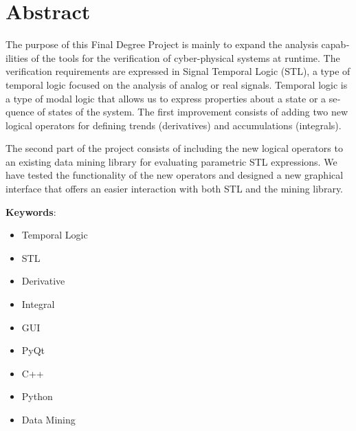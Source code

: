 \section*{Abstract}
\begin{otherlanguage}{british}
The purpose of this Final Degree Project is mainly to expand the analysis capabilities of the tools for the verification of cyber-physical systems at runtime. The verification requirements are expressed in Signal Temporal Logic (STL), a type of temporal logic focused on the analysis of analog or real signals. Temporal logic is a type of modal logic that allows us to express properties about a state or a sequence of states of the system. The first improvement consists of adding two new logical operators for defining trends (derivatives) and accumulations (integrals).

The second part of the project consists of including the new logical operators to an existing data mining library for evaluating parametric STL expressions. We have tested the functionality of the new operators and designed a new graphical interface that offers an easier interaction with both STL and the mining library.
\end{otherlanguage}

\textbf{Keywords}:
\begin{itemize}
\item Temporal Logic
\item STL
\item Derivative
\item Integral
\item GUI
\item PyQt
\item C++
\item Python
\item Data Mining
\end{itemize}